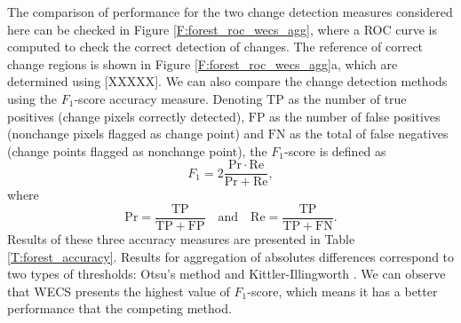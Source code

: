 \documentclass[journal]{IEEEtran}
\begin{document}
The comparison of performance for the two change detection measures considered here can be checked in Figure \ref{F:forest_roc_wecs_agg}, where a ROC curve is computed to check the correct detection of changes. The reference of correct change regions is shown in Figure \ref{F:forest_roc_wecs_agg}a, which are determined using [XXXXX]. We can also compare the change detection methods using the $F_1$-score accuracy measure. Denoting $\mathrm{TP}$ as the number of true positives (change pixels correctly detected), $\mathrm{FP}$ as the number of false positives (nonchange pixels flagged as change point) and $\mathrm{FN}$ as the total of false negatives (change points flagged as nonchange point), the $F_1$-score is defined as
\begin{equation*}
F_1 = 2\frac{\mathrm{Pr}\cdot\mathrm{Re}}{\mathrm{Pr}+\mathrm{Re}}	,
\end{equation*}
where
\begin{equation*}
\mathrm{Pr}=\frac{\mathrm{TP}}{\mathrm{TP}+\mathrm{FP}}\quad 
\text{and} \quad \mathrm{Re} = \frac{\mathrm{TP}}{\mathrm{TP}+\mathrm{FN}}.
\end{equation*}
Results of these three accuracy measures are presented in Table \ref{T:forest_accuracy}. Results for aggregation of absolutes differences correspond to two types of thresholds: Otsu's method and Kittler-Illingworth \cite{kittler1986minimum}. We can observe that WECS presents the highest value of $F_1$-score, which means it has a better performance that the competing method.
\end{document}
